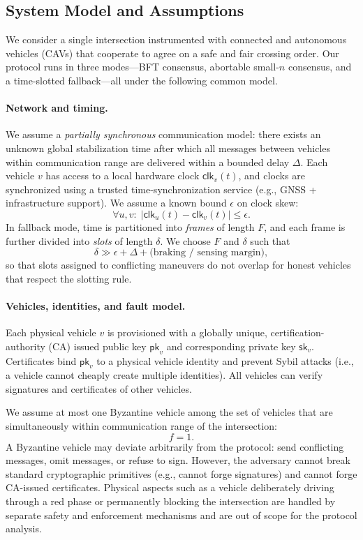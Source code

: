 \documentclass[fleqn,10pt]{olplainarticle}
\begin{document}
\subsection{System Model and Assumptions}
\label{subsec:system-model}

We consider a single intersection instrumented with connected and autonomous vehicles (CAVs) that cooperate to agree on a safe and fair crossing order. Our protocol runs in three modes---BFT consensus, abortable small-$n$ consensus, and a time-slotted fallback---all under the following common model.

\paragraph{Network and timing.}
We assume a \emph{partially synchronous} communication model: there exists an unknown global stabilization time after which all messages between vehicles within communication range are delivered within a bounded delay $\Delta$. Each vehicle $v$ has access to a local hardware clock $\mathsf{clk}_v(t)$, and clocks are synchronized using a trusted time-synchronization service (e.g., GNSS + infrastructure support). We assume a known bound $\epsilon$ on clock skew:
\[
  \forall u,v:\;\bigl|\mathsf{clk}_u(t) - \mathsf{clk}_v(t)\bigr| \le \epsilon.
\]
In fallback mode, time is partitioned into \emph{frames} of length $F$, and each frame is further divided into \emph{slots} of length $\delta$. We choose $F$ and $\delta$ such that
\[
  \delta \gg \epsilon + \Delta + \text{(braking / sensing margin)},
\]
so that slots assigned to conflicting maneuvers do not overlap for honest vehicles that respect the slotting rule.

\paragraph{Vehicles, identities, and fault model.}
Each physical vehicle $v$ is provisioned with a globally unique, certification-authority (CA) issued public key $\mathsf{pk}_v$ and corresponding private key $\mathsf{sk}_v$. Certificates bind $\mathsf{pk}_v$ to a physical vehicle identity and prevent Sybil attacks (i.e., a vehicle cannot cheaply create multiple identities). All vehicles can verify signatures and certificates of other vehicles.

We assume at most one Byzantine vehicle among the set of vehicles that are simultaneously within communication range of the intersection:
\[
  f = 1.
\]
A Byzantine vehicle may deviate arbitrarily from the protocol: send conflicting messages, omit messages, or refuse to sign. However, the adversary cannot break standard cryptographic primitives (e.g., cannot forge signatures) and cannot forge CA-issued certificates. Physical aspects such as a vehicle deliberately driving through a red phase or permanently blocking the intersection are handled by separate safety and enforcement mechanisms and are out of scope for the protocol analysis.
\end{document}
